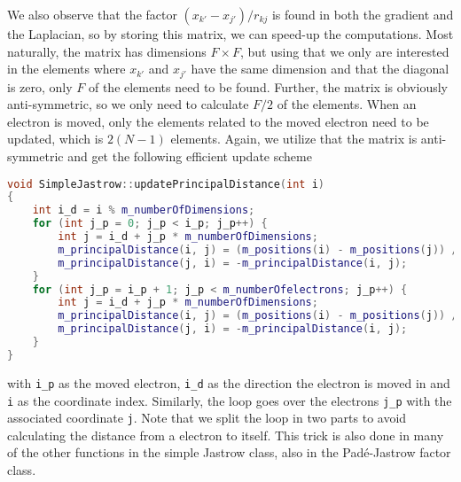 We also observe that the factor $(x_{k'}-x_{j'})/r_{kj}$ is found in both the gradient and the Laplacian, so by storing this matrix, we can speed-up the computations. Most naturally, the matrix has dimensions $F\times F$, but using that we only are interested in the elements where $x_{k'}$ and $x_{j'}$ have the same dimension and that the diagonal is zero, only $F$ of the elements need to be found. Further, the matrix is obviously anti-symmetric, so we only need to calculate $F/2$ of the elements. When an electron is moved, only the elements related to the moved electron need to be updated, which is $2(N-1)$ elements. Again, we utilize that the matrix is anti-symmetric and get the following efficient update scheme
\begin{lstlisting}[language={c++}]
void SimpleJastrow::updatePrincipalDistance(int i)
{
	int i_d = i % m_numberOfDimensions;
	for (int j_p = 0; j_p < i_p; j_p++) {
		int j = i_d + j_p * m_numberOfDimensions;
		m_principalDistance(i, j) = (m_positions(i) - m_positions(j)) / m_distanceMatrix(i_p, j_p);
		m_principalDistance(j, i) = -m_principalDistance(i, j);
	}
	for (int j_p = i_p + 1; j_p < m_numberOfelectrons; j_p++) {
		int j = i_d + j_p * m_numberOfDimensions;
		m_principalDistance(i, j) = (m_positions(i) - m_positions(j)) / m_distanceMatrix(i_p, j_p);
		m_principalDistance(j, i) = -m_principalDistance(i, j);
	}
}
\end{lstlisting}
with \lstinline{i_p} as the moved electron, \lstinline{i_d} as the direction the electron is moved in and \lstinline|i| as the coordinate index. Similarly, the loop goes over the electrons \lstinline{j_p} with the associated coordinate \lstinline{j}. Note that we split the loop in two parts to avoid calculating the distance from a electron to itself. This trick is also done in many of the other functions in the simple Jastrow class, also in the Padé-Jastrow factor class. 

